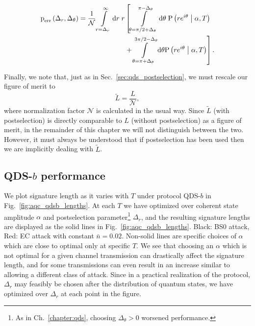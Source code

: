 \begin{align}
\perr\left(\Delta_r, \Delta_\theta\right) = \frac{1}{\mathcal{N}} \int\limits_{r = \Delta_r}^\infty \mathrm{d}r\; r  &\left[ \int\limits_{\theta = \pi/2 + \Delta_\theta}^{\pi - \Delta_\theta} \mathrm{d}\theta \; \text{P}\left(r e^{i \theta} \given \alpha, T\right)\right. \notag \\
%
&\left. + \int\limits_{\theta = \pi + \Delta_\theta}^{3\pi/2 - \Delta_\theta} \mathrm{d}\theta \text{P}\left(r e^{i \theta}\given \alpha, T\right)\right].
\end{align}

\noindent Finally, we note that, just as in Sec.~\ref{sec:qds_postselection}, we must rescale our figure of merit to
\begin{equation}
\tilde{L} = \frac{L}{\mathcal{N}},
\end{equation}
where normalization factor $\mathcal{N}$ is calculated in the usual way. Since $\tilde{L}$ (with postselection) is directly comparable to $L$ (without postselection) as a figure of merit, in the remainder of this chapter we will not distinguish between the two. However, it must always be understood that if postselection has been used then we are implicitly dealing with $\tilde{L}$.





\subsection{QDS-$b$ performance}\label{sec:qdsb_performance}

We plot signature length as it varies with $T$ under protocol QDS-$b$ in Fig.~\ref{fig:aqc_qdsb_lengths}. At each $T$ we have optimized over coherent state amplitude $\alpha$ and postselection parameter\footnote{As in Ch.~\ref{chapter:qds}, choosing $\Delta_\theta>0$ worsened performance.} $\Delta_r$, and the resulting signature lengths are displayed as the solid lines in Fig.~\ref{fig:aqc_qdsb_lengths}. Black: BS$0$ attack, Red: EC attack with constant $\bar{n}=0.02$. Non-solid lines are specific choices of $\alpha$ which are close to optimal only at specific $T$. We see that choosing an $\alpha$ which is not optimal for a given channel transmission can drastically affect the signature length, and for some transmissions can even result in an increase similar to allowing a different class of attack. Since in a practical realization of the protocol, $\Delta_r$ may feasibly be chosen after the distribution of quantum states, we have optimized over $\Delta_r$ at each point in the figure.

